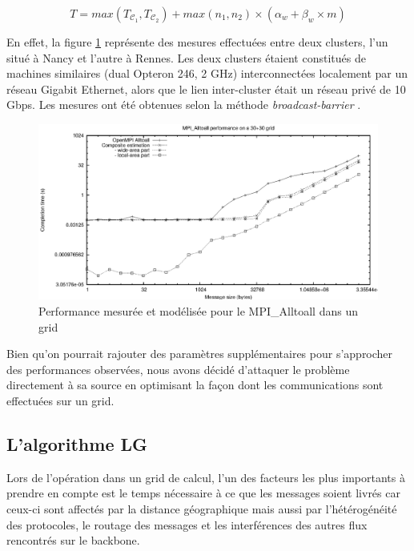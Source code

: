 \begin{equation}
T=max(T_{\mathcal C_1},T_{\mathcal C_2})+max(n_1, n_2) \times (\alpha_w+\beta_w \times m)
\label{eq:7}\end{equation}

En effet, la figure \ref{Figure: standard} représente des mesures effectuées entre deux clusters, l'un situé à Nancy et l'autre à Rennes. Les deux clusters étaient constitués de machines similaires (dual Opteron 246, 2 GHz) interconnectées localement par un réseau Gigabit Ethernet, alors que le lien inter-cluster était un réseau privé de 10 Gbps. Les mesures ont été obtenues selon la méthode \emph{broadcast-barrier} \cite{Supinski99}.


\begin{figure}
	\centering
	\includegraphics[width=0.7\columnwidth]{images/standard}
	\caption{\label{Figure: standard}Performance mesurée et modélisée pour le MPI\_Alltoall dans un grid} %
\end{figure}
 
Bien qu'on pourrait rajouter des paramètres supplémentaires pour s'approcher des performances observées, nous avons décidé d'attaquer le problème directement à sa source en optimisant la façon dont les communications sont effectuées sur un grid. 


\subsection{L'algorithme LG}

Lors de l'opération dans un grid de calcul, l'un des facteurs les plus importants à prendre en compte est le temps nécessaire à ce que les messages soient livrés car ceux-ci sont affectés par la distance géographique mais aussi par l'hétérogénéité des protocoles, le routage des messages et les interférences des autres flux rencontrés sur le backbone. 

